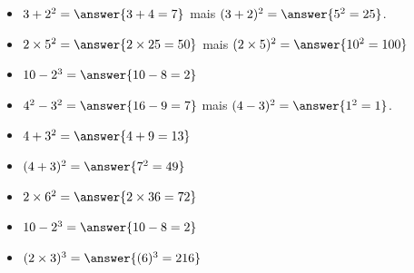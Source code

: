 \begin{exemplebox}
    \begin{itemize}
        \item $3+2^2=\answer{3+4=7}$  \hspace{1.5cm}mais  $(3+2)^2=\answer{5^2=25}$.
        \item $2\times5^2=\answer{2\times25=50}$  \hspace{1.5cm}mais
            $(2\times5)^2=\answer{10^2=100}$
        \item $10-2^3=\answer{10-8=2}$
        \item $4^2-3^2=\answer{16-9=7}$ \hspace{1.5cm}mais
            $(4-3)^2=\answer{1^2=1}$.
    \end{itemize}
\end{exemplebox}

\begin{exercicebox}
    \begin{itemize}
        \item $4+3^2=\answer{4+9 = 13}$
        \item $(4+3)^2=\answer{7^2=49}$
        \item $2\times6^2=\answer{2\times36=72}$
        \item $10-2^3=\answer{10-8=2}$
        \item $(2\times3)^3=\answer{(6)^3=216}$
    \end{itemize}
\end{exercicebox}
